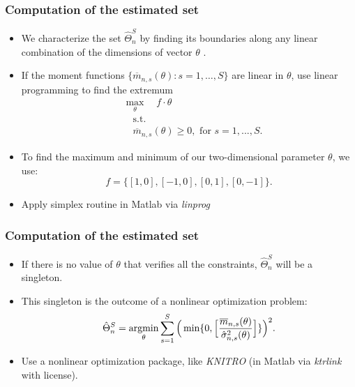 \documentclass[notes=show]{beamer}
\begin{document}
\begin{frame}
\frametitle{Computation of the estimated set}

\begin{itemize}
\item We characterize the set $\hat{\Theta}^{S}_{n}$ by finding its
boundaries along any linear combination of the dimensions of vector $\theta$%
. 

\item If the moment functions $\{\overline{m}_{n,s}(\theta ): s=1,\dots,S\}$
are linear in $\theta$, use linear programming to find the extremum  
\begin{equation}
\begin{split}
& \max_{\theta}\quad f\cdot \theta \\
& \quad \text{s.t.} \\
& \quad \overline{m}_{n,s}(\theta )\geq 0,\text{ for }s=1,...,S.
\label{eq: optvert}
\end{split}%
\end{equation}

\item To find the maximum and minimum of our two-dimensional parameter $%
\theta$, we use:  
\begin{equation*}
f=\{[1,0],[-1,0],[0,1],[0,-1]\}.
\end{equation*}

\item Apply simplex routine in Matlab via \textit{linprog}
\end{itemize}
\end{frame}


\begin{frame}
\frametitle{Computation of the estimated set}

\begin{itemize}
\item If there is no value of $\theta$ that verifies all the constraints, $%
\hat{\Theta}^{S}_{n}$ will be a singleton. 

\item This singleton is the outcome of a nonlinear optimization problem:  
\begin{equation*}
\hat{\Theta}^{S}_{n} = \operatornamewithlimits{argmin}_{\theta}\sum_{s=1}^{S}%
\Big(\min\{0,\Big[\frac{\overline{m}_{n,s}(\theta)}{\hat{\sigma}%
^{2}_{n,s}(\theta)}\Big]\}\Big)^{2}.
\end{equation*}

\item Use a nonlinear optimization package, like \textit{KNITRO} (in Matlab
via \textit{ktrlink} with license).
\end{itemize}
\end{frame}
\end{document}
